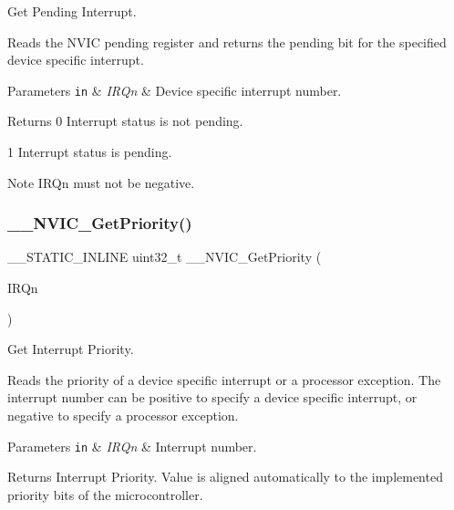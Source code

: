 Get Pending Interrupt. 

Reads the N\+V\+IC pending register and returns the pending bit for the specified device specific interrupt. 
\begin{DoxyParams}[1]{Parameters}
\mbox{\tt in}  & {\em I\+R\+Qn} & Device specific interrupt number. \\
\hline
\end{DoxyParams}
\begin{DoxyReturn}{Returns}
0 Interrupt status is not pending. 

1 Interrupt status is pending. 
\end{DoxyReturn}
\begin{DoxyNote}{Note}
I\+R\+Qn must not be negative. 
\end{DoxyNote}
\mbox{\label{group___c_m_s_i_s___core___n_v_i_c_functions_gaeb9dc99c8e7700668813144261b0bc73}} 
\subsubsection{\texorpdfstring{\+\_\+\+\_\+\+N\+V\+I\+C\+\_\+\+Get\+Priority()}{\_\_NVIC\_GetPriority()}}
{\footnotesize\ttfamily \+\_\+\+\_\+\+S\+T\+A\+T\+I\+C\+\_\+\+I\+N\+L\+I\+NE uint32\+\_\+t \+\_\+\+\_\+\+N\+V\+I\+C\+\_\+\+Get\+Priority (\begin{DoxyParamCaption}\item[{\hyperlink{group___peripheral__interrupt__number__definition_ga7e1129cd8a196f4284d41db3e82ad5c8}{I\+R\+Qn\+\_\+\+Type}}]{I\+R\+Qn }\end{DoxyParamCaption})}



Get Interrupt Priority. 

Reads the priority of a device specific interrupt or a processor exception. The interrupt number can be positive to specify a device specific interrupt, or negative to specify a processor exception. 
\begin{DoxyParams}[1]{Parameters}
\mbox{\tt in}  & {\em I\+R\+Qn} & Interrupt number. \\
\hline
\end{DoxyParams}
\begin{DoxyReturn}{Returns}
Interrupt Priority. Value is aligned automatically to the implemented priority bits of the microcontroller. 
\end{DoxyReturn}
\mbox{\label{group___c_m_s_i_s___core___n_v_i_c_functions_ga9b894af672df4373eb637f8288845c05}} 
